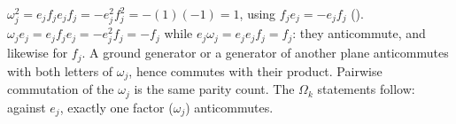 $\omega_j^2 = e_j f_j e_j f_j = -e_j^2 f_j^2 = -(1)(-1) = 1$, using $f_j e_j = -e_j f_j$ (). $\omega_j e_j = e_j f_j e_j = -e_j^2 f_j = -f_j$ while $e_j \omega_j = e_j e_j f_j = f_j$: they anticommute, and likewise for $f_j$. A ground generator or a generator of another plane anticommutes with both letters of $\omega_j$, hence commutes with their product. Pairwise commutation of the $\omega_j$ is the same parity count. The $\Omega_k$ statements follow: against $e_j$, exactly one factor ($\omega_j$) anticommutes.
